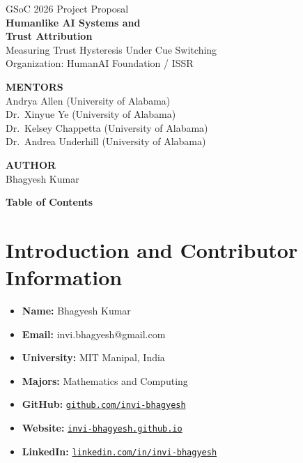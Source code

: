 \documentclass[12pt]{article}
\begin{document}
\begin{titlepage}
\centering

\vspace*{2cm}
{\Large GSoC 2026 Project Proposal}\\[2em]
{\huge\bfseries Humanlike AI Systems and\\[0.3em]Trust Attribution}\\[1.5em]
{\large Measuring Trust Hysteresis Under Cue Switching}\\[2em]
{\Large Organization: HumanAI Foundation / ISSR}

\vfill

{\Large\textbf{MENTORS}}\\[0.5em]
{\large Andrya Allen (University of Alabama)\\[0.3em]
Dr.~Xinyue Ye (University of Alabama)\\[0.3em]
Dr.~Kelsey Chappetta (University of Alabama)\\[0.3em]
Dr.~Andrea Underhill (University of Alabama)}

\vfill
\vfill

{\Large\textbf{AUTHOR}}\\[0.5em]
{\large Bhagyesh Kumar}

\vfill

\end{titlepage}

\begin{center}
{\LARGE\bfseries Table of Contents}
\end{center}

\tableofcontents

\newpage

\section{Introduction and Contributor Information}

\begin{itemize}
\item \textbf{Name:} Bhagyesh Kumar
\item \textbf{Email:} invi.bhagyesh@gmail.com
\item \textbf{University:} MIT Manipal, India
\item \textbf{Majors:} Mathematics and Computing
\item \textbf{GitHub:} \href{https://github.com/invi-bhagyesh}{\texttt{github.com/invi-bhagyesh}}
\item \textbf{Website:} \href{https://invi-bhagyesh.github.io/}{\texttt{invi-bhagyesh.github.io}}
\item \textbf{LinkedIn:} \href{https://www.linkedin.com/in/invi-bhagyesh/}{\texttt{linkedin.com/in/invi-bhagyesh}}
\end{itemize}
\end{document}
